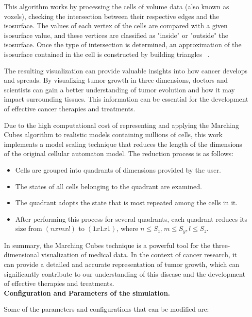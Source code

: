 \documentclass[a4paper,11pt]{article}
\begin{document}
{This algorithm works by processing the cells of volume data (also known as voxels), checking the intersection between their respective edges and the isosurface. The values of each vertex of the cells are compared with a given isosurface value, and these vertices are classified as "inside" or "outside" the isosurface. Once the type of intersection is determined, an approximation of the isosurface contained in the cell is constructed by building triangles ~\cite{1}.

The resulting visualization can provide valuable insights into how cancer develops and spreads. By visualizing tumor growth in three dimensions, doctors and scientists can gain a better understanding of tumor evolution and how it may impact surrounding tissues. This information can be essential for the development of effective cancer therapies and treatments.

Due to the high computational cost of representing and applying the Marching Cubes algorithm to realistic models containing millions of cells, this work implements a model scaling technique that reduces the length of the dimensions of the original cellular automaton model. The reduction process is as follows:
\begin{itemize}
    \item Cells are grouped into quadrants of dimensions provided by the user.
    \item The states of all cells belonging to the quadrant are examined.
    \item The quadrant adopts the state that is most repeated among the cells in it.
    \item After performing this process for several quadrants, each quadrant reduces its size from $(n x m x l)$ to $(1 x 1 x 1)$, where $n \leq S_{x} ,m \leq S_{y},l \leq S_{z}$. 
\end{itemize}

In summary, the Marching Cubes technique is a powerful tool for the three-dimensional visualization of medical data. In the context of cancer research, it can provide a detailed and accurate representation of tumor growth, which can significantly contribute to our understanding of this disease and the development of effective therapies and treatments.\\

\textbf{Configuration and Parameters of the simulation.}

Some of the parameters and configurations that can be modified are:
}
\end{document}
